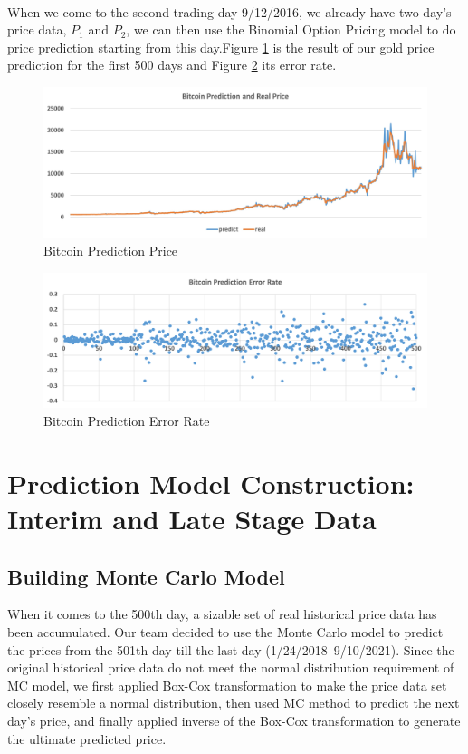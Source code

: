 \documentclass[12pt]{article}
\begin{document}
\paragraph{}
When we come to the second trading day 9/12/2016, we already have two day's price data, $P_1$ and $P_2$, we can then use the Binomial Option Pricing model to do price prediction starting from this day.Figure \ref{fig4:1} is the result of our gold price prediction for the first 500 days and Figure \ref{fig5:1} its error rate.
\begin{figure}[htp]
    \centering
    \includegraphics[width=.8\linewidth]{figures/fig4.jpg}  
    \caption{Bitcoin Prediction Price}
    \label{fig4:1}
\end{figure}
\begin{figure}[htp]
    \centering
    \includegraphics[width=0.8\linewidth]{figures/fig7}  
    \caption{Bitcoin Prediction Error Rate}
    \label{fig5:1}
\end{figure}
\newpage
\section{Prediction Model Construction: Interim and Late Stage Data}
\subsection{Building Monte Carlo Model}
When it comes to the 500th day, a sizable set of real historical price data has been accumulated. Our team decided to use the Monte Carlo model to predict the prices from the 501th day till the last day (1/24/2018~9/10/2021). Since the original historical price data do not meet the normal distribution requirement of MC model, we first applied Box-Cox transformation to make the price data set closely resemble a normal distribution, then used MC method to predict the next day's price, and finally applied inverse of the Box-Cox transformation to generate the ultimate predicted price. 
\end{document}
